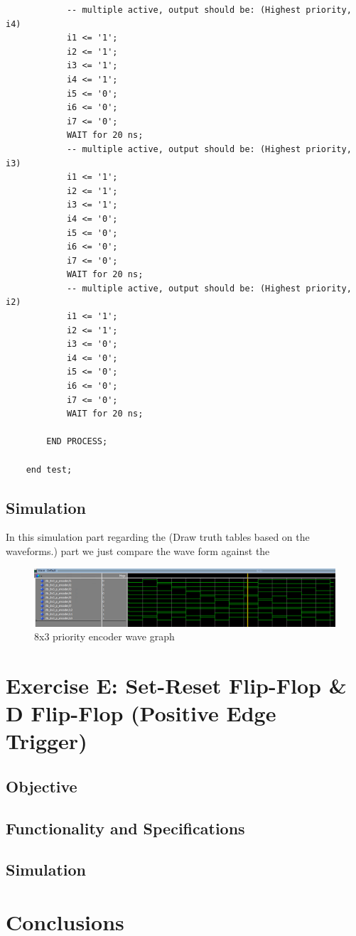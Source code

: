 \documentclass[12pt]{article}
\begin{document}
\begin{verbatim}
            -- multiple active, output should be: (Highest priority, i4)
            i1 <= '1';
            i2 <= '1';
            i3 <= '1';
            i4 <= '1';
            i5 <= '0';
            i6 <= '0';
            i7 <= '0';
            WAIT for 20 ns;
            -- multiple active, output should be: (Highest priority, i3)
            i1 <= '1';
            i2 <= '1';
            i3 <= '1';
            i4 <= '0';
            i5 <= '0';
            i6 <= '0';
            i7 <= '0';
            WAIT for 20 ns;
            -- multiple active, output should be: (Highest priority, i2)
            i1 <= '1';
            i2 <= '1';
            i3 <= '0';
            i4 <= '0';
            i5 <= '0';
            i6 <= '0';
            i7 <= '0';
            WAIT for 20 ns;

        END PROCESS;

    end test;

\end{verbatim}


\subsection{Simulation}
In this simulation part regarding the (Draw truth tables based on the waveforms.) part we just compare the wave form against the
\begin{figure}[h]
\caption{8x3 priority encoder wave graph}
\centering
\includegraphics[width=\textwidth]{./diagrams/8x3_p_enc_simulation.png}
\end{figure}

\clearpage
\section{Exercise E: Set-Reset Flip-Flop \& D Flip-Flop (Positive Edge Trigger)}
\subsection{Objective}

\subsection{Functionality and Specifications}

\subsection{Simulation}

\section{Conclusions}
\end{document}
